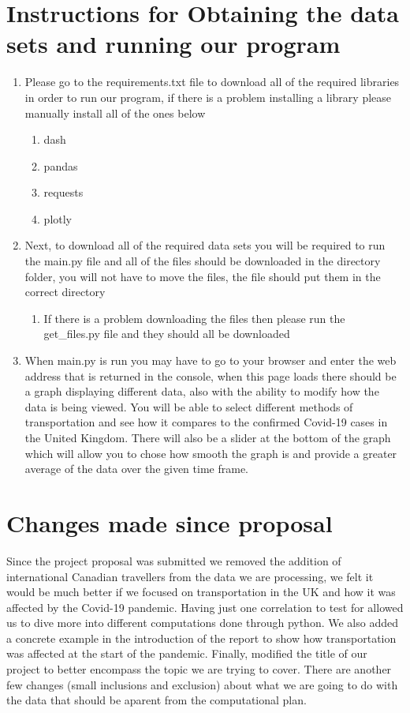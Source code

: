 \documentclass[fontsize=11pt]{article}
\begin{document}
\section*{Instructions for Obtaining the data sets and running our program}
\begin{enumerate}
    \item Please go to the requirements.txt file to download all of the required libraries in order to run our program, if there is a problem installing a library please manually install all of the ones below
    \begin{enumerate}
        \item dash
        \item pandas
        \item requests
        \item plotly
    \end{enumerate}
    \item Next, to download all of the required data sets you will be required to run the main.py file and all of the files should be downloaded in the directory folder, you will not have to move the files, the file should put them in the correct directory
    \begin{enumerate}
        \item If there is a problem downloading the files then please run the get\_files.py file and they should all be downloaded
    \end{enumerate}
    \item When main.py is run you may have to go to your browser and enter the web address that is returned in the console, when this page loads there should be a graph displaying different data, also with the ability to modify how the data is being viewed. You will be able to select different methods of transportation and see how it compares to the confirmed Covid-19 cases in the United Kingdom. There will also be a slider at the bottom of the graph which will allow you to chose how smooth the graph is and provide a greater average of the data over the given time frame.
\end{enumerate}

\section*{Changes made since proposal}
Since the project proposal was submitted we removed the addition of international Canadian travellers from the data we are processing, we felt it would be much better if we focused on transportation in the UK and how it was affected by the Covid-19 pandemic. Having just one correlation to test for allowed us to dive more into different computations done through python. We also added a concrete example in the introduction of the report to show how transportation was affected at the start of the pandemic. Finally, modified the title of our project to better encompass the topic we are trying to cover. There are another few changes (small inclusions and exclusion) about what we are going to do with the data that should be aparent from the computational plan.
\end{document}

